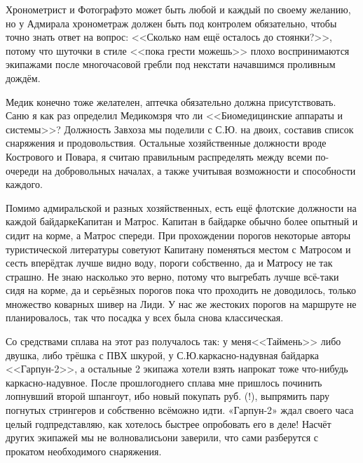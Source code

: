 Хронометрист и Фотограф\mdash это может быть любой и каждый по своему желанию, но у Адмирала хронометраж должен быть под контролем обязательно, чтобы точно знать ответ на вопрос: <<Сколько нам ещё осталось до стоянки?>>, потому что шуточки в стиле <<пока грести можешь>> плохо воспринимаются экипажами после многочасовой гребли под некстати начавшимся проливным дождём. 

Медик конечно тоже желателен, аптечка обязательно должна присутствовать. Саню я как раз определил Медиком\mdash зря что ли <<Биомедицинские аппараты и системы>>? Должность Завхоза мы поделили с С.Ю. на двоих, составив список снаряжения и продовольствия. Остальные хозяйственные должности вроде Кострового и Повара, я считаю правильным распределять между всеми по-очереди на добровольных началах, а также учитывая возможности и способности каждого. 

Помимо адмиральской и разных хозяйственных, есть ещё флотские должности на каждой байдарке\mdash Капитан и Матрос. Капитан в байдарке обычно более опытный и сидит на корме, а Матрос спереди. При прохождении порогов некоторые авторы туристической литературы советуют Капитану поменяться местом с Матросом и сесть вперёд\mdash так лучше видно воду, пороги собственно, да и Матросу не так страшно. Не знаю насколько это верно, потому что выгребать лучше всё-таки сидя на корме, да и серьёзных порогов пока что проходить не доводилось, только множество коварных шивер на Лиди. У нас же жестоких порогов на маршруте не планировалось, так что посадка у всех была снова классическая. 

Со средствами сплава на этот раз получалось так: у меня\mdash <<Таймень>>  либо двушка, либо трёшка с ПВХ шкурой, у С.Ю.\mdash каркасно-надувная байдарка <<Гарпун-2>>, а остальные 2 экипажа хотели взять напрокат тоже что-нибудь каркасно-надувное. После прошлогоднего сплава мне пришлось починить лопнувший второй шпангоут, ибо новый покупать руб. (!), выпрямить пару погнутых стрингеров и собственно всё\mdash можно идти. «Гарпун-2» ждал своего часа целый год\mdash представляю, как хотелось быстрее опробовать его в деле! Насчёт других экипажей мы не волновались\mdash они заверили, что сами разберутся с прокатом необходимого снаряжения. 

